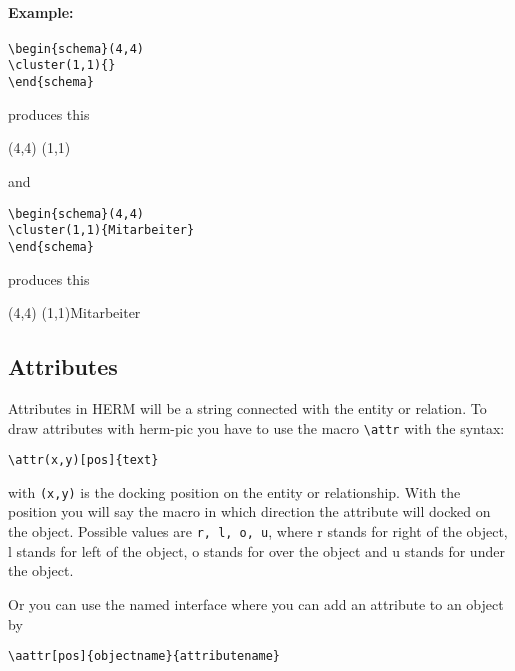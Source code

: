\documentclass[a4paper,11pt]{article}
\begin{document}
\paragraph{Example:}

\begin{verbatim}
\begin{schema}(4,4)
\cluster(1,1){}
\end{schema}

\end{verbatim}

produces this

\begin{schema}(4,4)
\cluster(1,1){}
\end{schema}

and 

\begin{verbatim}
\begin{schema}(4,4)
\cluster(1,1){Mitarbeiter}
\end{schema}

\end{verbatim}

produces this

\begin{schema}(4,4)
\cluster(1,1){Mitarbeiter}
\end{schema}

\subsection{Attributes}

Attributes in HERM will be a string connected with the entity or relation.
To draw attributes with herm-pic you have to use the macro \verb|\attr| with the syntax:

\begin{verbatim}
\attr(x,y)[pos]{text}
\end{verbatim}

with {\tt (x,y)} is the docking position on the entity or relationship. With the
position you will say the macro in which direction the attribute will docked on
the object. Possible values are {\tt r, l, o, u}, where r stands for right of the object,
l stands for left of the object, o stands for over the object and u stands for under the object.

Or you can use the named interface where you can add an attribute to an object by

\begin{verbatim}
\aattr[pos]{objectname}{attributename}
\end{verbatim}
\end{document}

